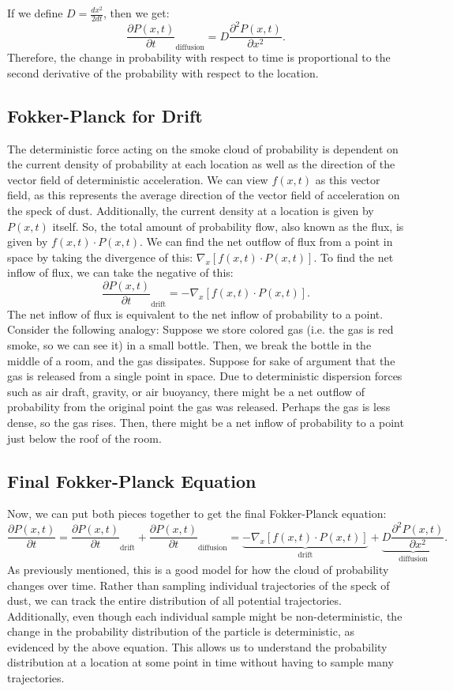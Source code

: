 \documentclass{article}
\begin{document}
If we define $D=\frac{dx^2}{2dt}$, then we get:
\[\frac{\partial P(x,t)}{\partial t}_\text{diffusion}=D\frac{\partial ^2 P(x,t)}{\partial x^2}.\]
Therefore, the change in probability with respect to time is proportional to the second derivative of the probability with respect to the location. 


\subsection{Fokker-Planck for Drift}
The deterministic force acting on the smoke cloud of probability is dependent on the current density of probability at each location as well as the direction of the vector field of deterministic acceleration. We can view $f(x,t)$ as this vector field, as this represents the average direction of the vector field of acceleration on the speck of dust. Additionally, the current density at a location is given by $P(x,t)$ itself. So, the total amount of probability flow, also known as the flux, is given by $f(x,t)\cdot P(x,t)$. We can find the net outflow of flux from a point in space by taking the divergence of this: $\nabla_x [f(x,t)\cdot P(x,t)]$. To find the net inflow of flux, we can take the negative of this:
\[\frac{\partial P(x,t)}{\partial t}_\text{drift}=-\nabla_x[f(x,t)\cdot P(x,t)].\]
The net inflow of flux is equivalent to the net inflow of probability to a point. Consider the following analogy: Suppose we store colored gas (i.e. the gas is red smoke, so we can see it) in a small bottle. Then, we break the bottle in the middle of a room, and the gas dissipates. Suppose for sake of argument that the gas is released from a single point in space. Due to deterministic dispersion forces such as air draft, gravity, or air buoyancy, there might be a net outflow of probability from the original point the gas was released. Perhaps the gas is less dense, so the gas rises. Then, there might be a net inflow of probability to a point just below the roof of the room. 

\subsection{Final Fokker-Planck Equation}
Now, we can put both pieces together to get the final Fokker-Planck equation:
\[\frac{\partial P(x,t)}{\partial t}=\frac{\partial P(x,t)}{\partial t}_{\text{drift}}+\frac{\partial P(x,t)}{\partial t}_{\text{diffusion}}=\underbrace{-\nabla_x[f(x,t)\cdot P(x,t)]}_{\text{drift}}+\underbrace{D\frac{\partial ^2 P(x,t)}{\partial x^2}}_{\text{diffusion}}.\]
\noindent
As previously mentioned, this is a good model for how the cloud of probability changes over time. Rather than sampling individual trajectories of the speck of dust, we can track the entire distribution of all potential trajectories. Additionally, even though each individual sample might be non-deterministic, the change in the probability distribution of the particle is deterministic, as evidenced by the above equation. This allows us to understand the probability distribution at a location at some point in time without having to sample many trajectories. 
\end{document}
